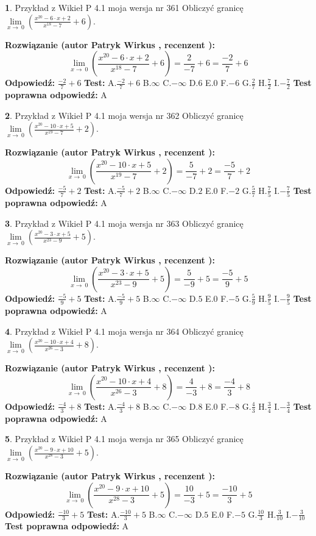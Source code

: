 \documentclass[12pt, a4paper]{article}
\theoremstyle{definition} %
\newtheorem{zad}{}
\newcommand{\zadStart}[1]{\begin{zad}#1\newline}
\newcommand{\zadStop}{\end{zad}}
\newcommand{\rozwStart}[2]{\noindent \textbf{Rozwiązanie (autor #1 , recenzent #2): }\newline}
\newcommand{\rozwStop}{\newline}
\newcommand{\odpStart}{\noindent \textbf{Odpowiedź:}\newline}
\newcommand{\odpStop}{\newline}
\newcommand{\testStart}{\noindent \textbf{Test:}\newline}
\newcommand{\testStop}{\newline}
\newcommand{\kluczStart}{\noindent \textbf{Test poprawna odpowiedź:}\newline}
\newcommand{\kluczStop}{\newline}
\begin{document}
\zadStart{Przykład z Wikieł P 4.1 moja wersja nr 361}
Obliczyć granicę $\lim\limits_{x\to\ 0}(\frac{x^{20}-6 \cdot x +2}{x^{18}-7}+6)$.
\zadStop
\rozwStart{Patryk Wirkus}{}
$$\lim\limits_{x\to\ 0}(\frac{x^{20}-6 \cdot x +2}{x^{18}-7}+6)=\frac{2}{-7}+6=\frac{-2}{7}+6$$
\rozwStop
\odpStart
$\frac{-2}{7}+6$
\odpStop
\testStart
A.$\frac{-2}{7}+6$
B.$\infty$
C.$-\infty$
D.$6$
E.$0$
F.$-6$
G.$\frac{2}{7}$
H.$\frac{7}{2}$
I.$-\frac{7}{2}$
\testStop
\kluczStart
A
\kluczStop



\zadStart{Przykład z Wikieł P 4.1 moja wersja nr 362}
Obliczyć granicę $\lim\limits_{x\to\ 0}(\frac{x^{20}-10 \cdot x +5}{x^{19}-7}+2)$.
\zadStop
\rozwStart{Patryk Wirkus}{}
$$\lim\limits_{x\to\ 0}(\frac{x^{20}-10 \cdot x +5}{x^{19}-7}+2)=\frac{5}{-7}+2=\frac{-5}{7}+2$$
\rozwStop
\odpStart
$\frac{-5}{7}+2$
\odpStop
\testStart
A.$\frac{-5}{7}+2$
B.$\infty$
C.$-\infty$
D.$2$
E.$0$
F.$-2$
G.$\frac{5}{7}$
H.$\frac{7}{5}$
I.$-\frac{7}{5}$
\testStop
\kluczStart
A
\kluczStop



\zadStart{Przykład z Wikieł P 4.1 moja wersja nr 363}
Obliczyć granicę $\lim\limits_{x\to\ 0}(\frac{x^{20}-3 \cdot x +5}{x^{23}-9}+5)$.
\zadStop
\rozwStart{Patryk Wirkus}{}
$$\lim\limits_{x\to\ 0}(\frac{x^{20}-3 \cdot x +5}{x^{23}-9}+5)=\frac{5}{-9}+5=\frac{-5}{9}+5$$
\rozwStop
\odpStart
$\frac{-5}{9}+5$
\odpStop
\testStart
A.$\frac{-5}{9}+5$
B.$\infty$
C.$-\infty$
D.$5$
E.$0$
F.$-5$
G.$\frac{5}{9}$
H.$\frac{9}{5}$
I.$-\frac{9}{5}$
\testStop
\kluczStart
A
\kluczStop



\zadStart{Przykład z Wikieł P 4.1 moja wersja nr 364}
Obliczyć granicę $\lim\limits_{x\to\ 0}(\frac{x^{20}-10 \cdot x +4}{x^{26}-3}+8)$.
\zadStop
\rozwStart{Patryk Wirkus}{}
$$\lim\limits_{x\to\ 0}(\frac{x^{20}-10 \cdot x +4}{x^{26}-3}+8)=\frac{4}{-3}+8=\frac{-4}{3}+8$$
\rozwStop
\odpStart
$\frac{-4}{3}+8$
\odpStop
\testStart
A.$\frac{-4}{3}+8$
B.$\infty$
C.$-\infty$
D.$8$
E.$0$
F.$-8$
G.$\frac{4}{3}$
H.$\frac{3}{4}$
I.$-\frac{3}{4}$
\testStop
\kluczStart
A
\kluczStop



\zadStart{Przykład z Wikieł P 4.1 moja wersja nr 365}
Obliczyć granicę $\lim\limits_{x\to\ 0}(\frac{x^{20}-9 \cdot x +10}{x^{28}-3}+5)$.
\zadStop
\rozwStart{Patryk Wirkus}{}
$$\lim\limits_{x\to\ 0}(\frac{x^{20}-9 \cdot x +10}{x^{28}-3}+5)=\frac{10}{-3}+5=\frac{-10}{3}+5$$
\rozwStop
\odpStart
$\frac{-10}{3}+5$
\odpStop
\testStart
A.$\frac{-10}{3}+5$
B.$\infty$
C.$-\infty$
D.$5$
E.$0$
F.$-5$
G.$\frac{10}{3}$
H.$\frac{3}{10}$
I.$-\frac{3}{10}$
\testStop
\kluczStart
A
\kluczStop
\end{document}

